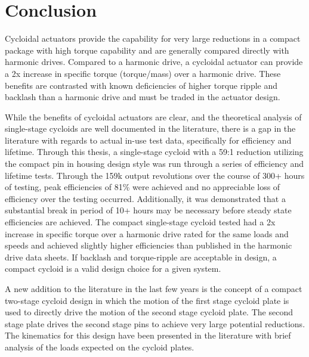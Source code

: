 
\chapter{Conclusion}\label{ch:conclusion}

Cycloidal actuators provide the capability for very large reductions in a compact package with high torque capability and are generally compared directly with harmonic drives. Compared to a harmonic drive, a cycloidal actuator can provide a 2x increase in specific torque (torque/mass) over a harmonic drive. These benefits are contrasted with known deficiencies of higher torque ripple and backlash than a harmonic drive and must be traded in the actuator design. 

While the benefits of cycloidal actuators are clear, and the theoretical analysis of single-stage cycloids are well documented in the literature, there is a gap in the literature with regards to actual in-use test data, specifically for efficiency and lifetime. Through this thesis, a single-stage cycloid with a 59:1 reduction utilizing the compact pin in housing design style was run through a series of efficiency and lifetime tests. Through the 159k output revolutions over the course of 300+ hours of testing, peak efficiencies of 81\% were achieved and no appreciable loss of efficiency over the testing occurred. Additionally, it was demonstrated that a substantial break in period of 10+ hours may be necessary before steady state efficiencies are achieved. The compact single-stage cycloid tested had a 2x increase in specific torque over a harmonic drive rated for the same loads and speeds and achieved slightly higher efficiencies than published in the harmonic drive data sheets. If backlash and torque-ripple are acceptable in design, a compact cycloid is a valid design choice for a given system. 

A new addition to the literature in the last few years is the concept of a compact two-stage cycloid design in which the motion of the first stage cycloid plate is used to directly drive the motion of the second stage cycloid plate. The second stage plate drives the second stage pins to achieve very large potential reductions. The kinematics for this design have been presented in the literature with brief analysis of the loads expected on the cycloid plates. 

